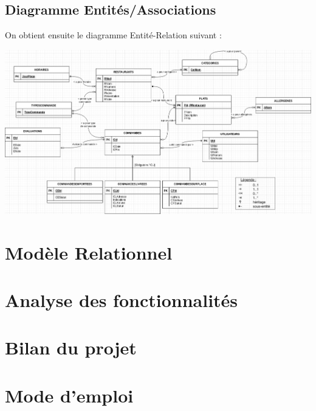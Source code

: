 \documentclass[10pt, a4paper]{article}
\begin{document}
\begin{landscape}
\subsection{Diagramme Entités/Associations}
On obtient ensuite le diagramme Entité-Relation suivant :
\begin{center}
\includegraphics[scale=0.7]{Diagramme_entite_relation.png}\\
\end{center}

\section{Modèle Relationnel}
\section{Analyse des fonctionnalités}
\section{Bilan du projet}
\section{Mode d'emploi}


\end{landscape}
\end{document}
